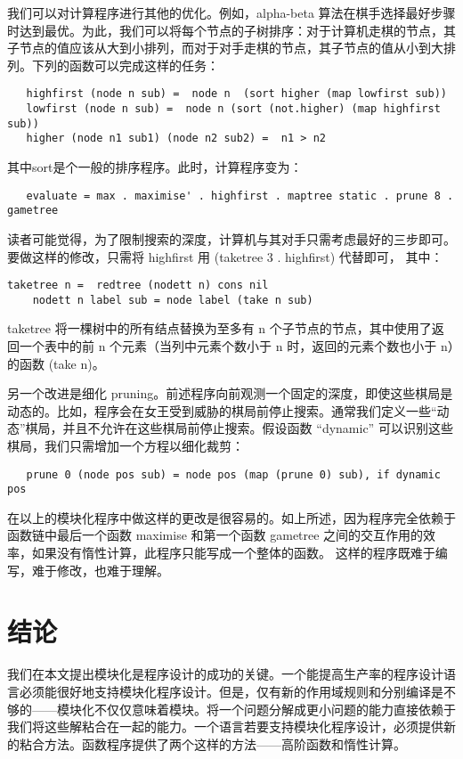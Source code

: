 \documentclass[12pt]{article}
\begin{document}
我们可以对计算程序进行其他的优化。例如，alpha-beta 算法在棋手选择最好步骤时达到最优。为此，我们可以将每个节点的子树排序：对于计算机走棋的节点，其子节点的值应该从大到小排列，而对于对手走棋的节点，其子节点的值从小到大排列。下列的函数可以完成这样的任务： 

\begin{verbatim}
   highfirst (node n sub) =  node n  (sort higher (map lowfirst sub))
   lowfirst (node n sub) =  node n (sort (not.higher) (map highfirst sub))
   higher (node n1 sub1) (node n2 sub2) =  n1 > n2
\end{verbatim}

其中sort是个一般的排序程序。此时，计算程序变为：
\begin{verbatim}
   evaluate = max . maximise' . highfirst . maptree static . prune 8 . gametree
\end{verbatim}

读者可能觉得，为了限制搜索的深度，计算机与其对手只需考虑最好的三步即可。要做这样的修改，只需将 highfirst 用 (taketree 3 . highfirst) 代替即可， 其中：

\begin{verbatim}
taketree n =  redtree (nodett n) cons nil
    nodett n label sub = node label (take n sub)
\end{verbatim}

taketree 将一棵树中的所有结点替换为至多有 n 个子节点的节点，其中使用了返回一个表中的前 n 个元素（当列中元素个数小于 n 时，返回的元素个数也小于 n）的函数 (take n)。

另一个改进是细化 pruning。前述程序向前观测一个固定的深度，即使这些棋局是动态的。比如，程序会在女王受到威胁的棋局前停止搜索。通常我们定义一些``动态''棋局，并且不允许在这些棋局前停止搜索。假设函数 ``dynamic'' 可以识别这些棋局，我们只需增加一个方程以细化裁剪：

\begin{verbatim}
   prune 0 (node pos sub) = node pos (map (prune 0) sub), if dynamic pos
\end{verbatim}

在以上的模块化程序中做这样的更改是很容易的。如上所述，因为程序完全依赖于函数链中最后一个函数 maximise 和第一个函数 gametree 之间的交互作用的效率，如果没有惰性计算，此程序只能写成一个整体的函数。 这样的程序既难于编写，难于修改，也难于理解。

\section{结论}

我们在本文提出模块化是程序设计的成功的关键。一个能提高生产率的程序设计语言必须能很好地支持模块化程序设计。但是，仅有新的作用域规则和分别编译是不够的——模块化不仅仅意味着模块。将一个问题分解成更小问题的能力直接依赖于我们将这些解粘合在一起的能力。一个语言若要支持模块化程序设计，必须提供新的粘合方法。函数程序提供了两个这样的方法——高阶函数和惰性计算。
\end{document}

